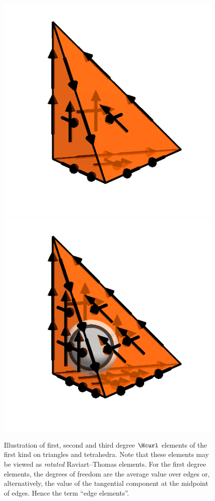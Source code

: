 \begin{figure}
  \includegraphics[width=\threefigs]{chapters/kirby-6/png/NED1_2_3d.png}
  \includegraphics[width=\threefigs]{chapters/kirby-6/png/NED1_3_3d.png}
  \caption{Illustration of first, second and third degree \nedelec{}
    $\Hcurl$ elements of the first kind on triangles and
    tetrahedra. Note that these elements may be viewed as
    \emph{rotated} Raviart--Thomas elements. For the first degree
    \nedelec{} elements, the degrees of freedom are the average
    value over edges or, alternatively, the value of the tangential
    component at the midpoint of edges. Hence the term ``edge
    elements''.}
  \label{kirby-6:fig:ned1}
\end{figure}

